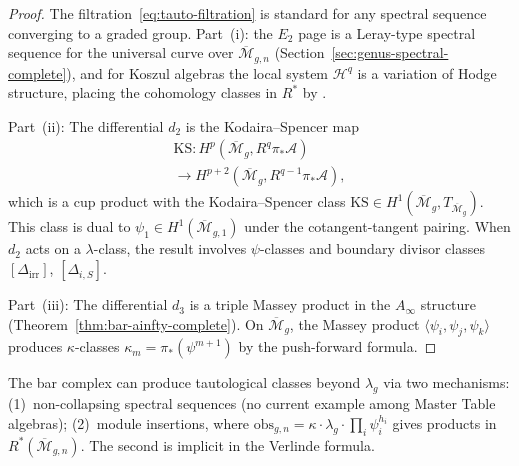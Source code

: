 \begin{proof}
The filtration~\eqref{eq:tauto-filtration} is standard for any
spectral sequence converging to a graded group.  Part~(i): the
$E_2$ page is a Leray-type spectral sequence for the universal
curve over $\overline{\mathcal{M}}_{g,n}$
(Section~\ref{sec:genus-spectral-complete}), and for Koszul
algebras the local system $\mathcal{H}^q$ is a variation of Hodge
structure, placing the cohomology classes in $R^*$ by
\cite[Appendix~A]{FP00}.

Part~(ii): The differential $d_2$ is the Kodaira--Spencer map
\begin{multline*}
\mathrm{KS}\colon H^p(\overline{\mathcal{M}}_g, R^q\pi_*\mathcal{A}) \\
\to H^{p+2}(\overline{\mathcal{M}}_g, R^{q-1}\pi_*\mathcal{A}),
\end{multline*}
which is a cup product with the Kodaira--Spencer class
$\mathrm{KS} \in H^1(\overline{\mathcal{M}}_g,
T_{\overline{\mathcal{M}}_g})$.  This class is dual to
$\psi_1 \in H^1(\overline{\mathcal{M}}_{g,1})$ under the
cotangent-tangent pairing.  When $d_2$ acts on a $\lambda$-class,
the result involves $\psi$-classes and boundary divisor classes
$[\Delta_{\mathrm{irr}}]$, $[\Delta_{i,S}]$.

Part~(iii): The differential $d_3$ is a triple Massey product in
the $A_\infty$ structure (Theorem~\ref{thm:bar-ainfty-complete}).
On $\overline{\mathcal{M}}_g$, the Massey product
$\langle \psi_i, \psi_j, \psi_k \rangle$ produces
$\kappa$-classes $\kappa_m = \pi_*(\psi^{m+1})$ by the
push-forward formula.
\end{proof}

\begin{remark}
\label{rem:tauto-beyond-lambda}
The bar complex can produce tautological classes beyond $\lambda_g$
via two mechanisms: (1)~non-collapsing spectral sequences (no
current example among Master Table algebras); (2)~module insertions,
where $\mathrm{obs}_{g,n}=\kappa\cdot\lambda_g\cdot
\prod_i\psi_i^{h_i}$ gives products in
$R^*(\overline{\mathcal{M}}_{g,n})$.
The second is implicit in the Verlinde formula.
\end{remark}

